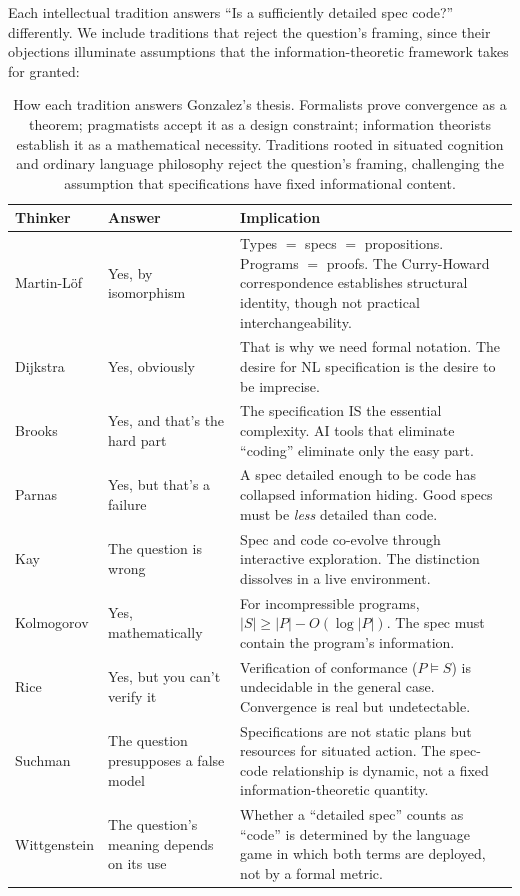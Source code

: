 \documentclass[11pt, a4paper, logo, copyright]{googledeepmind}
\begin{document}
Each intellectual tradition answers ``Is a sufficiently detailed spec code?'' differently. We include traditions that reject the question's framing, since their objections illuminate assumptions that the information-theoretic framework takes for granted:

\begin{table}[H]
\centering
\small
\begin{tabular}{llp{7.5cm}}
\toprule
\textbf{Thinker} & \textbf{Answer} & \textbf{Implication} \\
\midrule
Martin-L\"{o}f & Yes, by isomorphism & Types $=$ specs $=$ propositions. Programs $=$ proofs. The Curry-Howard correspondence establishes structural identity, though not practical interchangeability. \\
Dijkstra & Yes, obviously & That is why we need formal notation. The desire for NL specification is the desire to be imprecise. \\
Brooks & Yes, and that's the hard part & The specification IS the essential complexity. AI tools that eliminate ``coding'' eliminate only the easy part. \\
Parnas & Yes, but that's a failure & A spec detailed enough to be code has collapsed information hiding. Good specs must be \emph{less} detailed than code. \\
Kay & The question is wrong & Spec and code co-evolve through interactive exploration. The distinction dissolves in a live environment. \\
Kolmogorov & Yes, mathematically & For incompressible programs, $|S| \geq |P| - O(\log |P|)$. The spec must contain the program's information. \\
Rice & Yes, but you can't verify it & Verification of conformance ($P \models S$) is undecidable in the general case. Convergence is real but undetectable. \\
Suchman & The question presupposes a false model & Specifications are not static plans but resources for situated action. The spec-code relationship is dynamic, not a fixed information-theoretic quantity. \\
Wittgenstein & The question's meaning depends on its use & Whether a ``detailed spec'' counts as ``code'' is determined by the language game in which both terms are deployed, not by a formal metric. \\
\bottomrule
\end{tabular}
\caption{How each tradition answers Gonzalez's thesis. Formalists prove convergence as a theorem; pragmatists accept it as a design constraint; information theorists establish it as a mathematical necessity. Traditions rooted in situated cognition and ordinary language philosophy reject the question's framing, challenging the assumption that specifications have fixed informational content.}
\label{tab:seven-answers}
\end{table}
\end{document}
